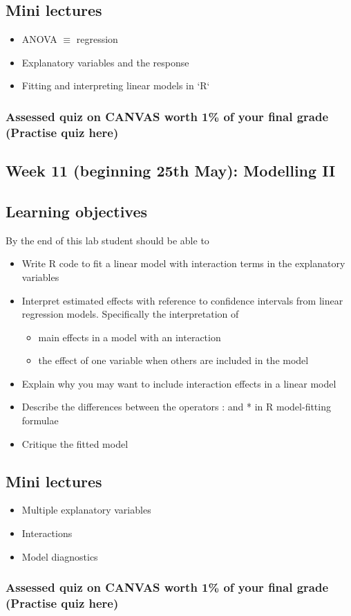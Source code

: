 \documentclass{article}
\begin{document}
\subsection*{Mini lectures}

\begin{itemize}
\item ANOVA $\equiv$ regression
\item Explanatory variables and the response
\item Fitting and interpreting linear models in `R`
\end{itemize}


\subsubsection*{Assessed quiz on CANVAS worth 1\% of your final grade (Practise quiz here)}

\newpage

\subsection*{Week 11 (beginning 25th May): Modelling II}
\subsection*{Learning objectives}
By the end of this lab student should be able to
\begin{itemize}
\item Write R code to fit a linear model with interaction terms in the explanatory variables
\item Interpret estimated effects with reference to confidence intervals from linear regression models. Specifically the interpretation of
  \begin{itemize}
  \item main effects in a model with an interaction
  \item the effect of one variable when others are included in the model
  \end{itemize}
\item Explain why you may want to include interaction effects in a linear model
\item Describe the differences between the operators : and * in R model-fitting formulae
\item Critique the fitted model
\end{itemize}

\subsection*{Mini lectures}

\begin{itemize}
\item Multiple explanatory variables
\item Interactions
\item Model diagnostics
\end{itemize}

\subsubsection*{Assessed quiz on CANVAS worth 1\% of your final grade (Practise quiz here)}
\end{document}
